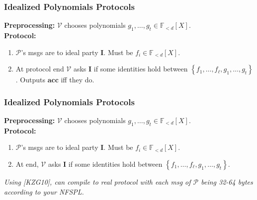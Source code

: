 \documentclass[shadesubsections,trans,14pt,mathserif]{beamer}
\newcommand{\F}{\ensuremath{\mathbb F}}
\newcommand{\set}[1]{\ensuremath{\left\{#1\right\}}}
\newcommand{\ver}{\ensuremath{\mathcal{V}}}
\newcommand{\prv}{\ensuremath{\mathcal{P}}}
\newcommand{\polysofdeg}[1]{\F_{< #1}[X]}
\newcommand{\acc}{{\mathbf{acc}}}
\newcommand{\ideal}{\mathbf{I}}
\begin{document}
\begin{frame}
\frametitle{Idealized Polynomials Protocols}   %
 
 \textbf{Preprocessing:} $\ver$ chooses polynomials $g_1,\ldots,g_t\in \polysofdeg{d}$.\\
 \vspace{0.4in}
\textbf{Protocol:}
  \begin{enumerate}

\item 
$\prv$'s  msgs are to ideal party $\ideal$. Must be $f_i\in \polysofdeg{d}$.
 \item At protocol end $\ver$ asks $\ideal$ if some identities hold between $\set{f_1,\ldots,f_\ell,g_1,\ldots,g_t}$.  Outputs $\acc$ iff they do.
\end{enumerate}
\end{frame}
\begin{frame}
\frametitle{Idealized Polynomials Protocols}   %
 
 \textbf{Preprocessing:} $\ver$ chooses polynomials $g_1,\ldots,g_t\in \polysofdeg{d}$.\\
 \vspace{0.2in}
\textbf{Protocol:}
 
 \begin{enumerate}

\item $\prv$'s  msgs are to ideal party $\ideal$. Must be $f_i\in \polysofdeg{d}$.
\item At end, $\ver$ asks $\ideal$ if some identities hold between $\set{f_1,\ldots,f_\ell,g_1,\ldots,g_t}$.  


\end{enumerate}
\emph{Using [KZG10], can compile to real protocol with each msg of $\prv$ being 32-64 bytes according to your NFSPL.} 

\end{frame}
\end{document}
